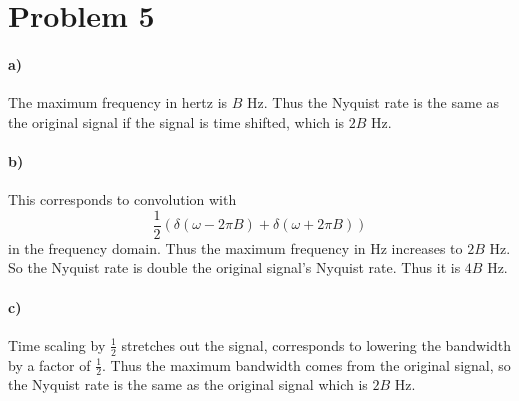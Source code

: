 \documentclass[12pt]{article}
\begin{document}
\section*{Problem 5}

\paragraph{a)}

The maximum frequency in hertz is \(B\) Hz. Thus the Nyquist rate is the same as the original signal if the signal is time shifted, which is \(2B\) Hz.

\paragraph{b)}

This corresponds to convolution with
\[\frac{1}{2}(\delta(\omega-2\pi B)+\delta(\omega+2\pi B))\]
in the frequency domain. Thus the maximum frequency in Hz increases to \(2B\) Hz. So the Nyquist rate is double the original signal's Nyquist rate.
Thus it is \(4B\) Hz.

\paragraph{c)}

Time scaling by \(\frac{1}{2}\) stretches out the signal, corresponds to lowering the bandwidth by a factor of \(\frac{1}{2}\). Thus the maximum bandwidth comes from
the original signal, so the Nyquist rate is the same as the original signal which is \(2B\) Hz.
\end{document}
